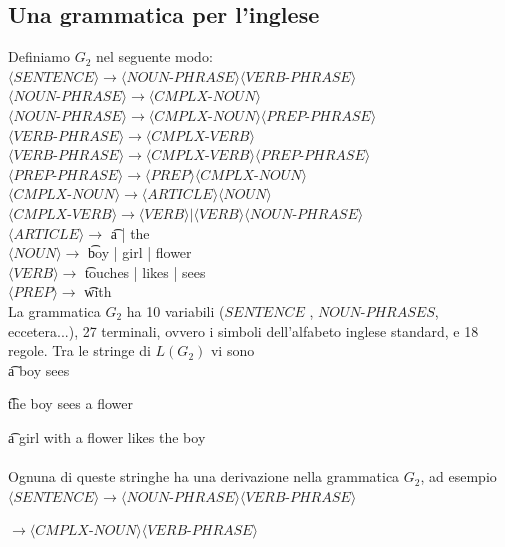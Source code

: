 \subsection{Una grammatica per l’inglese}
Definiamo $G_2$ nel seguente modo: \\
$\langle SENTENCE \rangle \rightarrow \langle NOUN$-$PHRASE\rangle \langle VERB$-$PHRASE \rangle$\\
$\langle NOUN$-$PHRASE\rangle \rightarrow \langle CMPLX$-$NOUN\rangle$\\
$\langle NOUN$-$PHRASE\rangle  \rightarrow \langle CMPLX$-$NOUN \rangle \langle PREP$-$PHRASE \rangle$ \\
$\langle VERB$-$PHRASE \rangle  \rightarrow \langle CMPLX$-$VERB \rangle$\\
$\langle VERB$-$PHRASE \rangle  \rightarrow \langle CMPLX$-$VERB \rangle \langle PREP$-$PHRASE \rangle$\\
$\langle PREP$-$PHRASE \rangle  \rightarrow \langle PREP\rangle\langle CMPLX$-$NOUN \rangle$\\
$\langle CMPLX$-$NOUN \rangle → \langle ARTICLE \rangle \langle NOUN\rangle$\\
$\langle CMPLX$-$VERB \rangle → \langle VERB\rangle | \langle VERB\rangle \langle NOUN$-$PHRASE\rangle$\\
$\langle ARTICLE \rangle \rightarrow$  \t{a | the}\\
$\langle NOUN\rangle\rightarrow$  \t{boy | girl | flower}\\
$\langle VERB\rangle\rightarrow$ \t{touches | likes | sees}\\
$\langle PREP\rangle\rightarrow$ \t{with}\\

\nin La grammatica $G_2$ ha 10 variabili ($SENTENCE$ , $NOUN$-$PHRASES$, eccetera...), 27 terminali, 
ovvero i simboli dell'alfabeto inglese standard, e 18 regole. Tra le stringe di $L(G_2)$ vi sono \\

	\t{a boy sees}
	
	\t{the boy sees a flower}
	
	\t{a girl with a flower likes the boy}\\
	\\
Ognuna di queste stringhe ha una derivazione nella grammatica $G_2$, ad esempio \\
$\langle SENTENCE \rangle \rightarrow \langle NOUN$-$PHRASE\rangle \langle VERB$-$PHRASE \rangle$

$\rightarrow\langle CMPLX$-$NOUN\rangle \langle VERB$-$PHRASE \rangle$

